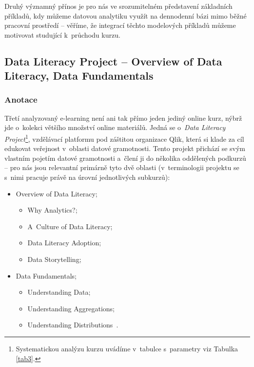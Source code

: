 Druhý významný přínos je pro nás ve srozumitelném představení základních příkladů, kdy můžeme datovou analytiku využít na dennodenní bázi mimo běžné pracovní prostředí -- věříme, že integrací těchto modelových příkladů můžeme motivovat studující k~průchodu kurzu.

\hypertarget{data-literacy-project-overview-of-data-literacy-data-fundamentals}{%
\subsection{Data Literacy Project -- Overview of Data Literacy, Data Fundamentals}\label{data-literacy-project-overview-of-data-literacy-data-fundamentals}}

\hypertarget{anotace-2}{%
\subsubsection{Anotace}\label{anotace-2}}

Třetí analyzovaný e-learning není ani tak přímo jeden jediný online kurz, nýbrž jde o~kolekci většího množství online materiálů. Jedná se o~\emph{Data Literacy Project}\footnote{Systematickou analýzu kurzu uvádíme v~tabulce s~parametry viz Tabulka \ref{tab3}.}, vzdělávací platformu pod záštitou organizace Qlik, která si klade za cíl edukovat veřejnost v~oblasti datové gramotnosti. Tento projekt přichází se svým vlastním pojetím datové gramotnosti a~člení ji do několika oddělených podkurzů -- pro nás jsou relevantní primárně tyto dvě oblasti (v~terminologii projektu se s~nimi pracuje právě na úrovní jednotlivých subkurzů):

\begin{itemize}
\tightlist
\item
  Overview of Data Literacy;

  \begin{itemize}
  \tightlist
  \item
    Why Analytics?;
  \item
    A~Culture of Data Literacy;
  \item
    Data Literacy Adoption;
  \item
    Data Storytelling;
  \end{itemize}
\item
  Data Fundamentals;

  \begin{itemize}
  \tightlist
  \item
    Understanding Data;
  \item
    Understanding Aggregations;
  \item
    Understanding Distributions~\parencite{course3}.
  \end{itemize}
\end{itemize}

